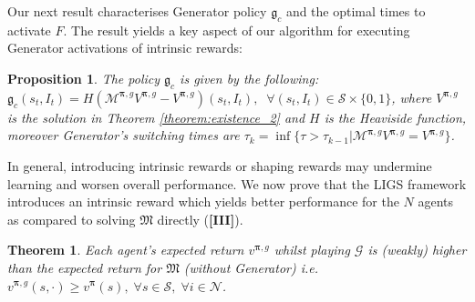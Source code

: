 \documentclass{article}
\newtheorem{theorem}{Theorem}
\newtheorem{definition}{Definition}
\newtheorem{proposition}{Proposition}
\begin{document}
% 
% 

Our next result characterises {\selectfont Generator} policy $\mathfrak{g}_c$ and the optimal times to activate $F$. The result yields a key aspect of our algorithm for executing  {\selectfont Generator} activations of intrinsic rewards:
\begin{proposition}\label{prop:switching_times}
The policy $\mathfrak{g}_c$ is given by the following: $\mathfrak{g}_c(s_t,I_t)=H(\mathcal{M}^{\boldsymbol{\pi},g}V^{\boldsymbol{\pi},g}- V^{\boldsymbol{\pi},g})(s_t,I_t),\;\;\forall (s_t,I_t)\in\mathcal{S}\times\{0,1\}$, where $V^{\boldsymbol{\pi},g}$ is the solution in Theorem \ref{theorem:existence_2} and $H$ is the Heaviside function, moreover {\selectfont Generator}'s switching times 
are $\tau_k=\inf\{\tau>\tau_{k-1}|\mathcal{M}^{\boldsymbol{\pi},g}V^{\boldsymbol{\pi},g}= V^{\boldsymbol{\pi},g}\}$. 
 

\end{proposition}



In general, introducing intrinsic rewards or shaping rewards may undermine learning and worsen overall performance. We now prove that the LIGS framework introduces an intrinsic reward which yields better performance for the $N$ agents as compared to solving $\mathfrak{M}$ directly (\textbf{[III]}).  

\begin{theorem}\label{NE_improve_prop}
Each agent's expected return $v^{\boldsymbol{\pi},g}$ whilst playing $\mathcal{G}$ is (weakly) higher than the expected return for $\mathfrak{M}$ (without {\selectfont Generator}) i.e. $v^{\boldsymbol{\pi},g}(s,\cdot)\geq v^{\boldsymbol{\pi}}(s),\;\forall s \in\mathcal{S},\;\forall i \in\mathcal{N}$. 
\end{theorem}
\end{document}
